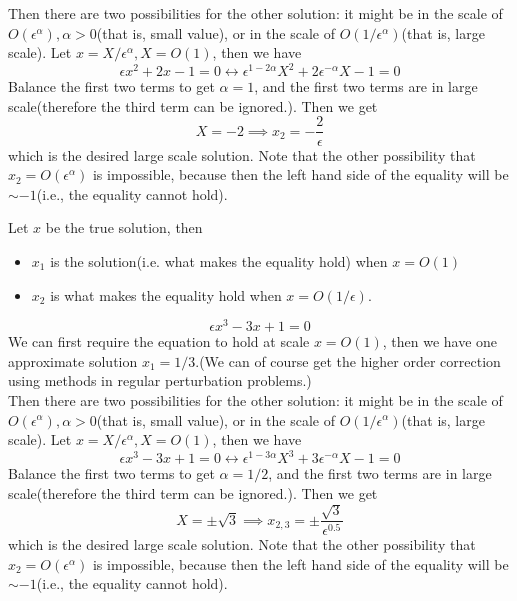 \begin{refsection}
\begin{example}
Then there are two possibilities for the other solution: it might be in the scale of $O(\epsilon^\alpha),\alpha > 0$(that is, small value), or in the scale of $O(1/\epsilon^\alpha)$(that is, large scale). Let $x = X/\epsilon^\alpha, X=O(1)$, then we have
$$\epsilon x^2 + 2 x - 1= 0 \leftrightarrow \epsilon^{1-2\alpha}X^2 + 2\epsilon^{-\alpha}X - 1 = 0$$
Balance the first two terms to get $\alpha = 1$, and the first two terms are in large scale(therefore the third term can be ignored.). Then we get 
$$X=-2 \implies x_2 = -\frac{2}{\epsilon}$$
which is the desired large scale solution. 
Note that the other possibility that $x_2 = O(\epsilon^\alpha)$ is impossible, because then the left hand side of the equality will be $\sim-1$(i.e., the equality cannot hold).  
\end{example}
\begin{remark}
	Let $x$ be the true solution, then 
	\begin{itemize}
		\item $x_1$ is the solution(i.e. what makes the equality hold) when $x=O(1)$
		\item $x_2$ is what makes the equality hold when $x=O(1/\epsilon)$. 
	\end{itemize}
\end{remark}

\begin{example}\cite[29]{holmes2012introduction}
	$$\epsilon x^3 - 3x + 1 = 0$$
	We can first require the equation to hold at scale $x = O(1)$, then we have one approximate solution $x_1 = 1/3$.(We can of course get the higher order correction using methods in regular perturbation problems.)\\
	
	Then there are two possibilities for the other solution: it might be in the scale of $O(\epsilon^\alpha),\alpha > 0$(that is, small value), or in the scale of $O(1/\epsilon^\alpha)$(that is, large scale). Let $x = X/\epsilon^\alpha, X=O(1)$, then we have
	$$\epsilon x^3 - 3x + 1= 0 \leftrightarrow \epsilon^{1-3\alpha}X^3 + 3\epsilon^{-\alpha}X - 1 = 0$$
	Balance the first two terms to get $\alpha = 1/2$, and the first two terms are in large scale(therefore the third term can be ignored.). Then we get 
	$$X= \pm \sqrt{3} \implies x_{2,3} = \pm \frac{\sqrt{3}}{\epsilon^{0.5}}$$
	which is the desired large scale solution. 
	Note that the other possibility that $x_2 = O(\epsilon^\alpha)$ is impossible, because then the left hand side of the equality will be $\sim-1$(i.e., the equality cannot hold).  
\end{example}


\end{refsection}

